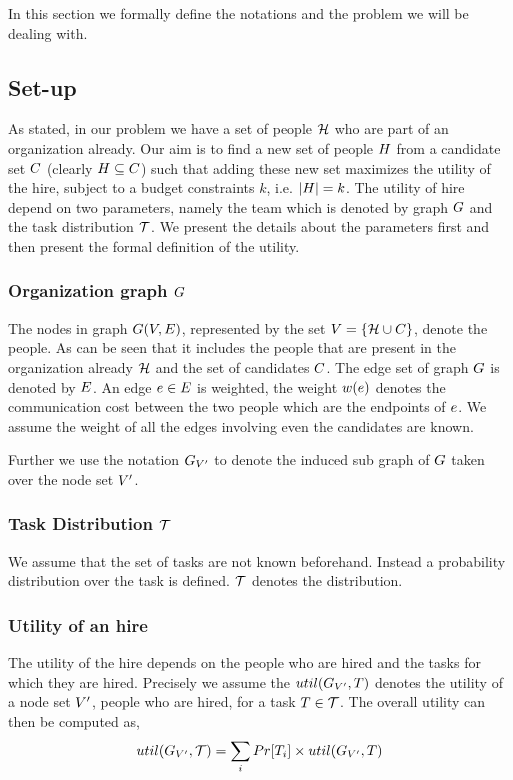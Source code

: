 In this section we formally define the notations and the problem we will be dealing with.
\subsection{Set-up}
As stated, in our problem we have a set of people $\mathcal{H}$ who are part of an organization already. Our aim is to find a new set of people ${H}$ from a candidate set ${C}$ (clearly ${H} \subseteq {C}$) such that adding these new set maximizes the utility of the hire, subject to a budget constraints $k$, i.e. $|{H}| = k$. The utility of hire depend on two parameters, namely the team which is denoted by graph ${G}$ and the task distribution $\mathcal{T}$. We present the details about the parameters first and then present the formal definition of the utility.

\subsubsection{Organization graph ${G}$}
The nodes in graph ${G}({V}, E)$, represented by the set ${V} = \{\mathcal{H} \cup {C}\}$, denote the people. As can be seen that it includes the people that are present in the organization already $\mathcal{H}$ and the set of candidates ${C}$. The edge set of graph ${G}$ is denoted by $E$. An edge $e \in E$ is weighted, the weight $w(e)$ denotes the communication cost between the two people which are the endpoints of $e$. We assume the weight of all the edges involving even the candidates are known. 

Further we use the notation ${G}_{{V}'}$ to denote the induced sub graph of ${G}$ taken over the node set ${V}'$. 

\subsubsection{Task Distribution $\mathcal{T}$}
We assume that the set of tasks are not known beforehand. Instead a probability distribution over the task is defined. $\mathcal{T}$ denotes the distribution.

\subsubsection{Utility of an hire}
The utility of the hire depends on the people who are hired and the tasks for which they are hired. Precisely we assume the $util({G}_{{V}'},T)$ denotes the utility of a node set ${V}'$, people who are hired, for a task $T \in \mathcal{T}$. The overall utility can then be computed as,
$$util({G}_{{V}'}, \mathcal{T}) = \sum_{i} Pr[T_i] \times util ({G}_{{V}'}, T) $$


